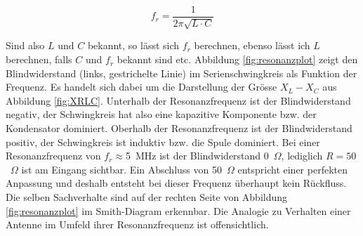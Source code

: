 \documentclass[twoside,a4paper,11pt,halfparskip,DIV=11,notitlepage]{scrartcl}
\begin{document}
$$
f_r = \frac{1}{2\pi\sqrt{L\cdot C}}
$$

Sind also $L$ und $C$ bekannt, so lässt sich $f_r$ berechnen, ebenso lässt ich
$L$ berechnen, falls $C$ und $f_r$ bekannt sind etc. Abbildung \ref{fig:resonanzplot}
zeigt den Blindwiderstand (links, gestrichelte Linie) im Serienschwingkreis als Funktion der Frequenz. Es
handelt sich dabei um die Darstellung der Grösse $X_L-X_C$ aus Abbildung \ref{fig:XRLC}.
Unterhalb der Resonanzfrequenz ist der Blindwiderstand negativ, der
Schwingkreis hat also eine kapazitive Komponente bzw. der Kondensator
dominiert. Oberhalb der Resonanzfrequenz ist der Blindwiderstand positiv, der
Schwingkreis ist induktiv bzw. die Spule dominiert. Bei einer Resonanzfrequenz
von $f_r\approx$5~MHz ist der Blindwiderstand 0~$\Omega$, lediglich $R=50$~$\Omega$
ist am Eingang sichtbar. Ein Abschluss von 50~$\Omega$ entspricht einer perfekten
Anpassung und deshalb entsteht bei dieser Frequenz überhaupt kein Rückfluss.
Die selben Sachverhalte sind auf der rechten Seite von Abbildung
\ref{fig:resonanzplot} im Smith-Diagram erkennbar. Die Analogie zu Verhalten
einer Antenne im Umfeld ihrer Resonanzfrequenz ist offensichtlich.
\end{document}
